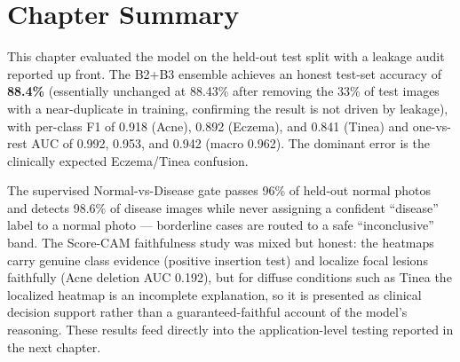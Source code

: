 
\section{Chapter Summary}

This chapter evaluated the model on the held-out test split with a leakage audit
reported up front. The B2+B3 ensemble achieves an honest test-set accuracy of
\textbf{88.4\%} (essentially unchanged at 88.43\% after removing the 33\% of test
images with a near-duplicate in training, confirming the result is not driven by
leakage), with per-class F1 of 0.918 (Acne), 0.892 (Eczema), and 0.841 (Tinea)
and one-vs-rest AUC of 0.992, 0.953, and 0.942 (macro 0.962). The dominant error
is the clinically expected Eczema/Tinea confusion.

The supervised Normal-vs-Disease gate passes 96\% of held-out normal photos and
detects 98.6\% of disease images while never assigning a confident ``disease''
label to a normal photo — borderline cases are routed to a safe ``inconclusive''
band. The Score-CAM faithfulness study was mixed but honest: the heatmaps carry
genuine class evidence (positive insertion test) and localize focal lesions
faithfully (Acne deletion AUC 0.192), but for diffuse conditions such as Tinea
the localized heatmap is an incomplete explanation, so it is presented as
clinical decision support rather than a guaranteed-faithful account of the
model's reasoning. These results feed directly into the application-level
testing reported in the next chapter.
